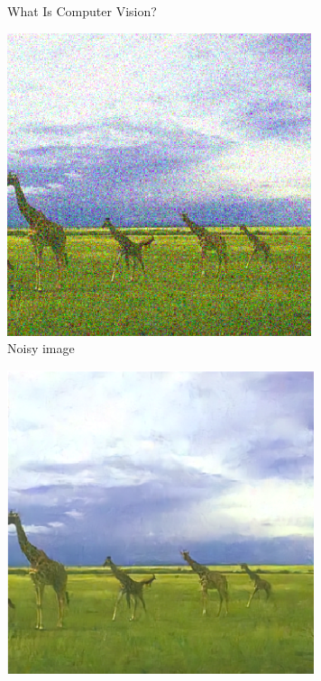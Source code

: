 \documentclass[default, aspectratio=169]{beamer}
\begin{document}
	\begin{frame}{What Is Computer Vision?}
		\centering
		\begin{minipage}{0.4\textwidth}
			\centering
			\includegraphics[width=\textwidth, keepaspectratio]{pic/noisy_image.png}
			\\Noisy image
		\end{minipage}%
		\hspace{0.1\textwidth} %
		\begin{minipage}{0.4\textwidth}
			\centering
			\includegraphics[width=\textwidth, keepaspectratio]{pic/denoised_image.png}

\end{minipage}
\end{frame}
\end{document}
